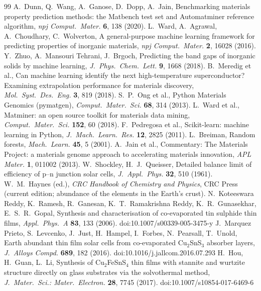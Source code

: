 \documentclass[11pt,a4paper]{article}
\begin{document}
\begin{thebibliography}{99}\small
{} A.~Dunn, Q.~Wang, A.~Ganose, D.~Dopp, A.~Jain, Benchmarking materials property prediction methods: the Matbench test set and Automatminer reference algorithm, \emph{npj Comput.\ Mater.} \textbf{6}, 138 (2020).
 L.~Ward, A.~Agrawal, A.~Choudhary, C.~Wolverton, A general-purpose machine learning framework for predicting properties of inorganic materials, \emph{npj Comput.\ Mater.} \textbf{2}, 16028 (2016).
 Y.~Zhuo, A.~Mansouri Tehrani, J.~Brgoch, Predicting the band gaps of inorganic solids by machine learning, \emph{J.\ Phys.\ Chem.\ Lett.} \textbf{9}, 1668 (2018).
 B.~Meredig et al., Can machine learning identify the next high-temperature superconductor? Examining extrapolation performance for materials discovery, \emph{Mol.\ Syst.\ Des.\ Eng.} \textbf{3}, 819 (2018).
 S.~P.~Ong et al., Python Materials Genomics (pymatgen), \emph{Comput.\ Mater.\ Sci.} \textbf{68}, 314 (2013).
 L.~Ward et al., Matminer: an open source toolkit for materials data mining, \emph{Comput.\ Mater.\ Sci.} \textbf{152}, 60 (2018).
 F.~Pedregosa et al., Scikit-learn: machine learning in Python, \emph{J.\ Mach.\ Learn.\ Res.} \textbf{12}, 2825 (2011).
 L.~Breiman, Random forests, \emph{Mach.\ Learn.} \textbf{45}, 5 (2001).
 A.~Jain et al., Commentary: The Materials Project: a materials genome approach to accelerating materials innovation, \emph{APL Mater.} \textbf{1}, 011002 (2013).
 W.~Shockley, H.~J.~Queisser, Detailed balance limit of efficiency of p--n junction solar cells, \emph{J.\ Appl.\ Phys.} \textbf{32}, 510 (1961).
 W.~M.~Haynes (ed.), \emph{CRC Handbook of Chemistry and Physics}, CRC Press (current edition; abundance of the elements in the Earth's crust).
 N.~Koteeswara Reddy, K.~Ramesh, R.~Ganesan, K.~T.~Ramakrishna Reddy, K.~R.~Gunasekhar, E.~S.~R.~Gopal, Synthesis and characterisation of co-evaporated tin sulphide thin films, \emph{Appl.\ Phys.\ A} \textbf{83}, 133 (2006). doi:10.1007/s00339-005-3475-y
 J.~Marquez Prieto, S.~Levcenko, J.~Just, H.~Hampel, I.~Forbes, N.~Pearsall, T.~Unold, Earth abundant thin film solar cells from co-evaporated Cu$_2$SnS$_3$ absorber layers, \emph{J.\ Alloys Compd.} \textbf{689}, 182 (2016). doi:10.1016/j.jallcom.2016.07.293
 H.~Hou, H.~Guan, L.~Li, Synthesis of Cu$_2$FeSnS$_4$ thin films with stannite and wurtzite structure directly on glass substrates via the solvothermal method, \emph{J.\ Mater.\ Sci.: Mater.\ Electron.} \textbf{28}, 7745 (2017). doi:10.1007/s10854-017-6469-6

\end{thebibliography}
\end{document}

